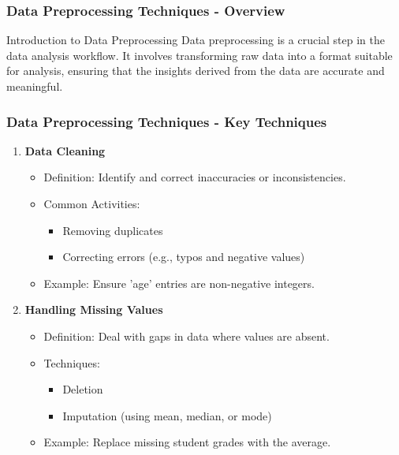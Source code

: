\documentclass[aspectratio=169]{beamer}
\begin{document}
\begin{frame}[fragile]
    \frametitle{Data Preprocessing Techniques - Overview}
    \begin{block}{Introduction to Data Preprocessing}
        Data preprocessing is a crucial step in the data analysis workflow. 
        It involves transforming raw data into a format suitable for analysis, 
        ensuring that the insights derived from the data are accurate and meaningful.
    \end{block}
\end{frame}

\begin{frame}[fragile]
    \frametitle{Data Preprocessing Techniques - Key Techniques}
    \begin{enumerate}
        \item \textbf{Data Cleaning}
        \begin{itemize}
            \item Definition: Identify and correct inaccuracies or inconsistencies.
            \item Common Activities:
            \begin{itemize}
                \item Removing duplicates
                \item Correcting errors (e.g., typos and negative values)
            \end{itemize}
            \item Example: Ensure 'age' entries are non-negative integers.
        \end{itemize}
        
        \item \textbf{Handling Missing Values}
        \begin{itemize}
            \item Definition: Deal with gaps in data where values are absent.
            \item Techniques:
            \begin{itemize}
                \item Deletion
                \item Imputation (using mean, median, or mode)
            \end{itemize}
            \item Example: Replace missing student grades with the average.
        \end{itemize}
    \end{enumerate}
\end{frame}
\end{document}
